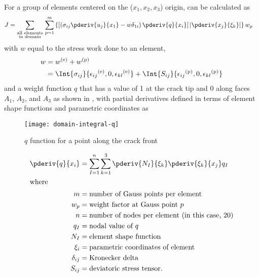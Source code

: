 For a group of elements centered on the (\(x_1, x_2, x_3\)) origin, \J can be calculated as
\begin{align}
J &= \sum_{\substack{\text{all elements}\\\text{in domain}}} \, \sum_{p=1}^{m} 
  \left\{
    \left[
      \left( 
        \sigma_{ij} \pderiv{u_j}{x_1} - w \delta_{1i}
      \right)
      \pderiv{q}{x_i}
    \right]
    \left|
      \pderiv{x_j}{\xi_k}
    \right|
  \right\}
  w_p
\end{align}
with \(w\) equal to the stress work done to an element,
\begin{align}
w &= w^{(\text{e})} + w^{(\text{p})} \\
  &= \Int{\sigma_{ij}}{\epsilon{_{ij}}^{(\text{e})},0,{\epsilon{_{kl}}^{(\text{e})}}} + \Int{S_{ij}}{\epsilon{_{ij}}^{(\text{p})},0,{\epsilon{_{kl}}^{(\text{p})}}}
\end{align}
and a weight function \(q\) that has a value of 1 at the crack tip and 0 along faces \(A_1\), \(A_2\), and \(A_3\) as shown in , with partial derivatives defined in terms of element shape functions and parametric coordinates as
\begin{figure}[bp]
\centering
\texttt{[image: domain-integral-q]}
\caption[\(q\) function for a point along the crack front]{\label{fig:domain-integral-q} \(q\) function for a point along the crack front \citep{warp3d}}
\end{figure}
\begin{align}
\pderiv{q}{x_i} &= \sum_{I=1}^n \sum_{k=1}^{3} \pderiv{N_I}{\xi_k} \pderiv{\xi_k}{x_j} q_I \\
\intertext{where}
m &= \text{number of Gauss points per element} \nonumber \\
w_p &= \text{weight factor at Gauss point } p \nonumber \\
n &= \text{number of nodes per element (in this case, 20)} \nonumber \\
q_I &= \text{nodal value of } q \nonumber \\
N_I &= \text{element shape function} \nonumber \\
\xi_i &= \text{parametric coordinates of element} \nonumber \\
\delta_{ij} &= \text{Kronecker delta} \nonumber \\
S_{ij} &= \text{deviatoric stress tensor.} \nonumber
\end{align}

